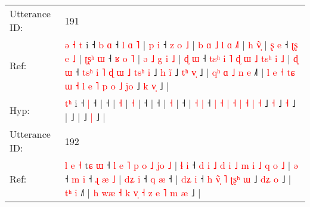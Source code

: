 \documentclass[10pt]{article}
\DeclareRobustCommand{\hl}[1]{{\textcolor{red}{#1}}}
\begin{document}
\begin{longtable}{ll}
 \\
\midrule
Utterance ID: & 191 \\
Ref: & \hl{ə}\hl{ }\hl{˧}\hl{ }\hl{t} i ˧\hl{ }\hl{b} \hl{ɑ} ˧\hl{ }\hl{l}\hl{ }\hl{ɑ}\hl{ }\hl{˥} |\hl{ }\hl{p}\hl{ }\hl{i} ˧\hl{ }\hl{z}\hl{ }\hl{o}\hl{ }\hl{˩} |\hl{ }\hl{b}\hl{ }\hl{ɑ}\hl{ }\hl{˩}\hl{ }\hl{l}\hl{ }\hl{ɑ} \hl{˩}\hl{˥} |\hl{ }\hl{h} \hl{v}\hl{̃}\hl{̩} |\hl{ }\hl{ʂ}\hl{ }\hl{e} ˧\hl{ }\hl{ʈ}\hl{ʂ}\hl{ }\hl{e}\hl{ }\hl{˩} |\hl{ }\hl{ʈ}\hl{ʂ}\hl{ʰ}\hl{ }\hl{ɯ} ˧\hl{ }\hl{ʁ}\hl{ }\hl{o}\hl{ }\hl{˥} |\hl{ }\hl{ə}\hl{ }\hl{˩}\hl{ }\hl{g}\hl{ }\hl{i} \hl{˩} |\hl{ }\hl{ɖ}\hl{ }\hl{ɯ} ˧\hl{ }\hl{t}\hl{s}\hl{ʰ}\hl{ }\hl{i}\hl{ }\hl{˥}\hl{ }\hl{ɖ}\hl{ }\hl{ɯ}\hl{ }\hl{˩}\hl{ }\hl{t}\hl{s}\hl{ʰ}\hl{ }\hl{i}\hl{ }\hl{˩} | \hl{ɖ} \hl{ɯ} ˧ \hl{t}\hl{s}\hl{ʰ} \hl{i} \hl{˥} \hl{ɖ} \hl{ɯ} \hl{˩} \hl{t}\hl{s}\hl{ʰ} \hl{i} ˩\hl{ }\hl{h} \hl{i}\hl{̃} ˩\hl{ }\hl{t}\hl{ʰ} \hl{v}\hl{̩} ˩ |\hl{ }\hl{q}\hl{ʰ}\hl{ }\hl{ɑ}\hl{ }\hl{˩}\hl{ }\hl{n}\hl{ }\hl{e} ˩\hl{˥} |\hl{ }\hl{l}\hl{ }\hl{e}\hl{ }\hl{˧}\hl{ }\hl{t}\hl{ɕ}\hl{ }\hl{ɯ}\hl{ }\hl{˧}\hl{ }\hl{l}\hl{ }\hl{e}\hl{ }\hl{˥}\hl{ }\hl{p}\hl{ }\hl{o}\hl{ }\hl{˩}\hl{ }\hl{j}\hl{o} ˩\hl{ }\hl{k} \hl{v}\hl{̩} ˩ |
 \\
Hyp: & \hl{}\hl{}\hl{}\hl{t}\hl{ʰ} i ˧\hl{}\hl{} \hl{|} ˧\hl{}\hl{}\hl{}\hl{}\hl{}\hl{} |\hl{}\hl{}\hl{}\hl{} ˧\hl{}\hl{}\hl{}\hl{}\hl{}\hl{} |\hl{}\hl{}\hl{}\hl{}\hl{}\hl{}\hl{}\hl{}\hl{}\hl{} \hl{}\hl{˧} |\hl{}\hl{} \hl{}\hl{}\hl{˧} |\hl{}\hl{}\hl{}\hl{} ˧\hl{}\hl{}\hl{}\hl{}\hl{}\hl{}\hl{} |\hl{}\hl{}\hl{}\hl{}\hl{}\hl{} ˧\hl{}\hl{}\hl{}\hl{}\hl{}\hl{} |\hl{}\hl{}\hl{}\hl{}\hl{}\hl{}\hl{}\hl{} \hl{˧} |\hl{}\hl{}\hl{}\hl{} ˧\hl{}\hl{}\hl{}\hl{}\hl{}\hl{}\hl{}\hl{}\hl{}\hl{}\hl{}\hl{}\hl{}\hl{}\hl{}\hl{}\hl{}\hl{}\hl{}\hl{}\hl{}\hl{} | \hl{˧} \hl{|} ˧ \hl{}\hl{}\hl{|} \hl{˧} \hl{|} \hl{˧} \hl{|} \hl{˧} \hl{}\hl{}\hl{|} \hl{˧} ˩\hl{}\hl{} \hl{}\hl{˧} ˩\hl{}\hl{}\hl{} \hl{}\hl{˧} ˩ |\hl{}\hl{}\hl{}\hl{}\hl{}\hl{}\hl{}\hl{}\hl{}\hl{}\hl{} ˩\hl{} |\hl{}\hl{}\hl{}\hl{}\hl{}\hl{}\hl{}\hl{}\hl{}\hl{}\hl{}\hl{}\hl{}\hl{}\hl{}\hl{}\hl{}\hl{}\hl{}\hl{}\hl{}\hl{}\hl{}\hl{}\hl{}\hl{}\hl{}\hl{} ˩\hl{}\hl{} \hl{}\hl{|} ˩ |
 \\
\midrule
Utterance ID: & 192 \\
Ref: & \hl{l}\hl{ }\hl{e}\hl{ }\hl{˧}\hl{ }t\hl{ɕ} \hl{ɯ} ˧\hl{ }\hl{l}\hl{ }\hl{e}\hl{ }\hl{˥}\hl{ }\hl{p}\hl{ }\hl{o}\hl{ }\hl{˩}\hl{ }\hl{j}\hl{o}\hl{ }\hl{˩} |\hl{ }\hl{ɬ}\hl{ }\hl{i} ˧\hl{ }\hl{d}\hl{ }\hl{i}\hl{ }\hl{˩}\hl{ }\hl{d}\hl{ }\hl{i}\hl{ }\hl{˩}\hl{ }\hl{m}\hl{ }\hl{i}\hl{ }\hl{˩}\hl{ }\hl{q}\hl{ }\hl{o}\hl{ }\hl{˩} |\hl{ }\hl{ə} ˧\hl{ }\hl{m} \hl{i} ˧\hl{ }\hl{ɻ}\hl{ }\hl{æ}\hl{ }\hl{˩} | \hl{d}\hl{ʑ} \hl{i} ˧\hl{ }\hl{q} \hl{æ} ˧ | \hl{d}\hl{ʑ} \hl{i} ˧\hl{ }\hl{h} \hl{v}\hl{̃}\hl{̩} \hl{˥} \hl{ʈ}\hl{ʂ}\hl{ʰ} \hl{ɯ} ˩\hl{ }\hl{d}\hl{ʑ} \hl{o} ˩ |\hl{ }\hl{t}\hl{ʰ}\hl{ }\hl{i} ˩\hl{˥} |\hl{ }\hl{h}\hl{ }\hl{w}\hl{æ}\hl{ }\hl{˧}\hl{ }\hl{k}\hl{ }\hl{v}\hl{̩}\hl{ }\hl{˧}\hl{ }\hl{z}\hl{ }\hl{e}\hl{ }\hl{˥}\hl{ }\hl{m}\hl{ }\hl{æ} ˩ |

\end{longtable}
\end{document}
